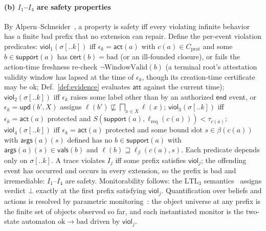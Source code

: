 \documentclass[conference,compsoc]{IEEEtran}
\theoremstyle{definition}
\theoremstyle{plain}
\newcommand{\Ione}{\ensuremath{I_1}}
\newcommand{\Ifour}{\ensuremath{I_4}}
\newcommand{\att}{\ensuremath{\mathsf{att}}}
\newcommand{\cert}{\ensuremath{\mathsf{cert}}}
\newcommand{\support}{\ensuremath{\mathsf{support}}}
\newcommand{\args}{\ensuremath{\mathsf{args}}}
\newcommand{\vals}{\ensuremath{\mathsf{vals}}}
\newcommand{\bindpol}{\ensuremath{\beta}}
\newcommand{\ev}[1]{\ensuremath{\mathsf{#1}}}
\newcommand{\lreq}{\ensuremath{\ell_{\mathrm{req}}}}
\newcommand{\Cprot}{\ensuremath{C_{\mathrm{prot}}}}
\begin{document}
\paragraph{(b) \Ione--\Ifour{} are safety properties}
By Alpern--Schneider~\cite{alpern}, a property is safety iff every
violating infinite behavior has a finite bad prefix that no
extension can repair. Define the per-event violation predicates:
$\mathsf{viol}_1(\sigma[..k])$ iff $\epsilon_k = \ev{act}(a)$ with
$c(a) \in \Cprot$ and some $b \in \support(a)$ has
$\cert(b) = \mathrm{bad}$ (or an ill-founded closure), or fails the
action-time freshness re-check $\neg\mathrm{WindowValid}(b)$ (a
terminal root's attestation validity window has lapsed at the time
of $\epsilon_k$, though its creation-time certificate may be
$\mathrm{ok}$; Def.~\ref{def:evidence} evaluates $\att$ against the
current time);
$\mathsf{viol}_2(\sigma[..k])$ iff $\epsilon_k$ raises some label
other than by an authorized $\ev{end}$ event, or
$\epsilon_k = \ev{upd}(b', X)$ assigns
$\ell(b') \not\sqsubseteq \bigsqcap_{x \in X} \ell(x)$;
$\mathsf{viol}_3(\sigma[..k])$ iff $\epsilon_k = \ev{act}(a)$
protected and $S(\support(a), \lreq(c(a))) < \tau_{c(a)}$;
$\mathsf{viol}_4(\sigma[..k])$ iff $\epsilon_k = \ev{act}(a)$ protected
and some bound slot $s \in \bindpol(c(a))$ with $\args(a)(s)$ defined
has no $b \in \support(a)$ with $\args(a)(s) \in \vals(b)$ and
$\ell(b) \sqsupseteq \ell_{\bindpol}(c(a), s)$. Each
predicate depends only on $\sigma[..k]$. A trace violates $I_j$
iff some prefix satisfies $\mathsf{viol}_j$; the offending event
has occurred and occurs in every extension, so the prefix is bad
and irremediable: \Ione--\Ifour{} are safety. Monitorability
follows: the $\mathrm{LTL}_3$ semantics~\cite{bauer,pnueli}
assigns verdict $\bot$ exactly at the first prefix satisfying
$\mathsf{viol}_j$. Quantification over beliefs and actions is
resolved by parametric monitoring~\cite{mop}: the object universe
at any prefix is the finite set of objects observed so far, and
each instantiated monitor is the two-state automaton
$\mathrm{ok} \to \mathrm{bad}$ driven by $\mathsf{viol}_j$.
\end{document}
